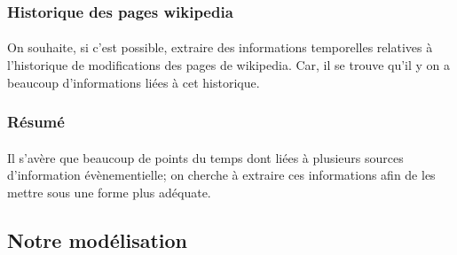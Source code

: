 \subsubsection*{Historique des pages wikipedia}
\paragraph{}
On souhaite, si c’est possible, extraire des informations temporelles relatives à l’historique de modifications des pages de wikipedia. Car, il se trouve qu’il y on a beaucoup d’informations liées à cet historique.
\subsubsection*{Résumé}
\paragraph{}
Il s'avère que beaucoup de points du temps dont liées à plusieurs sources d’information évènementielle; on cherche à extraire ces informations afin de les mettre sous une forme plus adéquate.
\subsection*{Notre modélisation}
